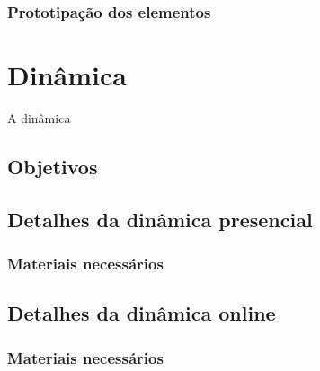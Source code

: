 \documentclass[
	12pt,
	openright,
	twoside,
	a4paper,
	english,
	brazil
	]{abntex2}
\begin{document}

\subsection{Prototipação dos elementos}





\chapter{Dinâmica}

A dinâmica

\section{Objetivos}

\section{Detalhes da dinâmica presencial}
\subsection{Materiais necessários}

\section{Detalhes da dinâmica online}
\subsection{Materiais necessários}
\end{document}
